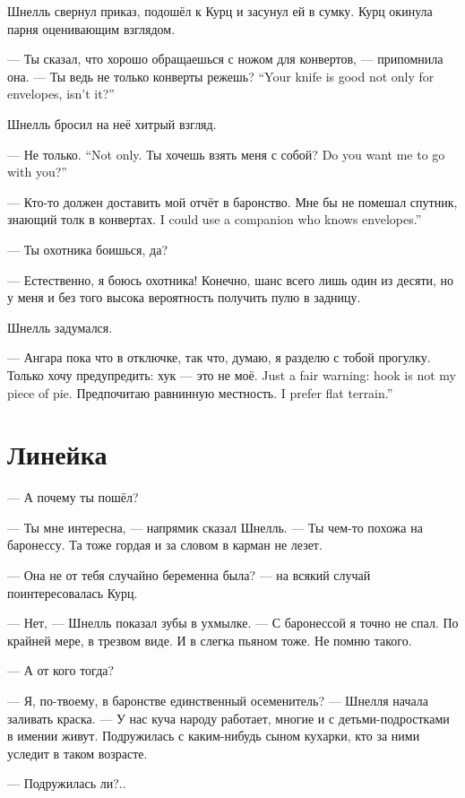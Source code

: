 Шнелль свернул приказ, подошёл к Курц и засунул ей в сумку.
Курц окинула парня оценивающим взглядом.

--- Ты сказал, что хорошо обращаешься с ножом для конвертов, --- припомнила она.
{--- Ты ведь не только конверты режешь?}
{``Your knife is good not only for envelopes, isn't it?''}

Шнелль бросил на неё хитрый взгляд.

{--- Не только.}
{``Not only.}
{Ты хочешь взять меня с собой?}
{Do you want me to go with you?''}

--- Кто-то должен доставить мой отчёт в баронство.
{Мне бы не помешал спутник, знающий толк в конвертах.}
{I could use a companion who knows envelopes.''}

--- Ты охотника боишься, да?

--- Естественно, я боюсь охотника!
Конечно, шанс всего лишь один из десяти, но у меня и без того высока вероятность получить пулю в задницу.

Шнелль задумался.

--- Ангара пока что в отключке, так что, думаю, я разделю с тобой прогулку.
{Только хочу предупредить: хук --- это не моё.}
{Just a fair warning: hook is not my piece of pie.}
{Предпочитаю равнинную местность.}
{I prefer flat terrain.''}

\section{Линейка}

--- А почему ты пошёл?

--- Ты мне интересна, --- напрямик сказал Шнелль.
--- Ты чем-то похожа на баронессу.
Та тоже гордая и за словом в карман не лезет.

--- Она не от тебя случайно беременна была? --- на всякий случай поинтересовалась Курц.

--- Нет, --- Шнелль показал зубы в ухмылке.
--- С баронессой я точно не спал.
По крайней мере, в трезвом виде.
И в слегка пьяном тоже.
Не помню такого.

--- А от кого тогда?

--- Я, по-твоему, в баронстве единственный осеменитель? --- Шнелля начала заливать краска.
--- У нас куча народу работает, многие и с детьми-подростками в имении живут.
Подружилась с каким-нибудь сыном кухарки, кто за ними уследит в таком возрасте.

--- Подружилась ли?..

